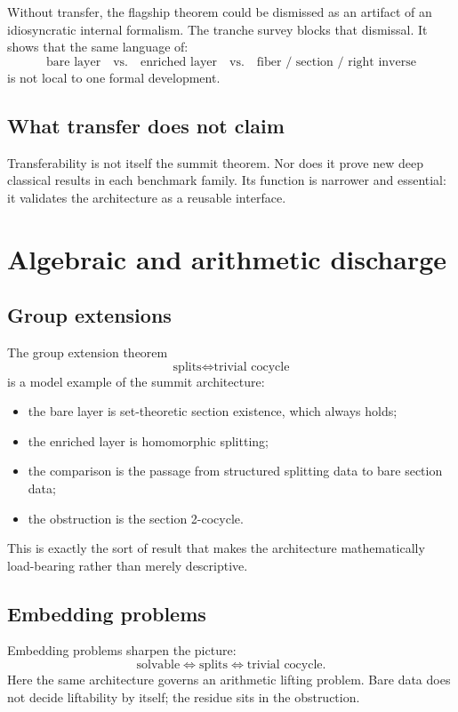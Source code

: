 \documentclass[11pt]{article}
\begin{document}
Without transfer, the flagship theorem could be dismissed as an artifact of an
idiosyncratic internal formalism. The tranche survey blocks that dismissal. It
shows that the same language of:
\[
\text{bare layer} \quad \text{vs.} \quad \text{enriched layer} \quad \text{vs.} \quad
\text{fiber / section / right inverse}
\]
is not local to one formal development.

\subsection{What transfer does not claim}

Transferability is not itself the summit theorem. Nor does it prove new deep
classical results in each benchmark family. Its function is narrower and
essential: it validates the architecture as a reusable interface.

\section{Algebraic and arithmetic discharge}\label{sec:alg-arith}

\subsection{Group extensions}

The group extension theorem
\[
\text{splits} \iff \text{trivial cocycle}
\]
is a model example of the summit architecture:
\begin{itemize}
  \item the bare layer is set-theoretic section existence, which always holds;
  \item the enriched layer is homomorphic splitting;
  \item the comparison is the passage from structured splitting data to bare section data;
  \item the obstruction is the section 2-cocycle.
\end{itemize}

This is exactly the sort of result that makes the architecture mathematically
load-bearing rather than merely descriptive.

\subsection{Embedding problems}

Embedding problems sharpen the picture:
\[
\text{solvable} \iff \text{splits} \iff \text{trivial cocycle}.
\]
Here the same architecture governs an arithmetic lifting problem. Bare data does
not decide liftability by itself; the residue sits in the obstruction.
\end{document}
